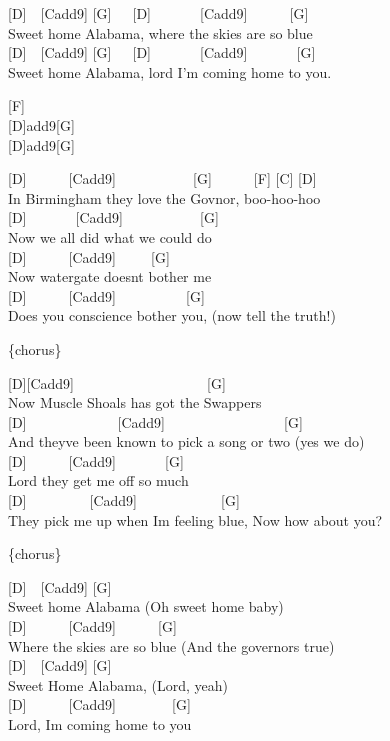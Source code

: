\documentclass[
  letterpaper,
  twoside=false]{scrbook}
\begin{document}
{[}D{]}~~{[}Cadd9{]}
{[}G{]}~~~{[}D{]}~~~~~~~{[}Cadd9{]}~~~~~~{[}G{]}~~~~~~~~\\
Sweet home Alabama, where the skies are so blue\\
{[}D{]}~~{[}Cadd9{]}
{[}G{]}~~~{[}D{]}~~~~~~~{[}Cadd9{]}~~~~~~~{[}G{]}~~~~~\\
Sweet home Alabama, lord I'm coming home to you.

{[}F{]}\\
{[}D{]}add9{[}G{]}\\
{[}D{]}add9{[}G{]}

{[}D{]}~~~~~~{[}Cadd9{]}~~~~~~~~~~~{[}G{]}~~~~~~{[}F{]} {[}C{]}
{[}D{]}\\
In Birmingham they love the Gov\textquotesingle nor, boo-hoo-hoo\\
{[}D{]}~~~~~~~{[}Cadd9{]}~~~~~~~~~~~{[}G{]}\\
Now we all did what we could do\\
{[}D{]}~~~~~~{[}Cadd9{]}~~~~~{[}G{]}\\
Now watergate doesn\textquotesingle t bother me\\
{[}D{]}~~~~~~{[}Cadd9{]}~~~~~~~~~~{[}G{]}\\
Does you conscience bother you, (now tell the truth!)

\{chorus\}

{[}D{]}{[}Cadd9{]}~~~~~~~~~~~~~~~~~~~{[}G{]}\\
Now Muscle Shoals has got the Swappers\\
{[}D{]}~~~~~~~~~~~~~{[}Cadd9{]}~~~~~~~~~~~~~~~~~{[}G{]}\\
And they\textquotesingle ve been known to pick a song or two (yes we
do)\\
{[}D{]}~~~~~~{[}Cadd9{]}~~~~~~~{[}G{]}\\
Lord they get me off so much\\
{[}D{]}~~~~~~~~~{[}Cadd9{]}~~~~~~~~~~~~{[}G{]}~~~\\
They pick me up when I\textquotesingle m feeling blue, Now how about
you?

\{chorus\}

{[}D{]}~~{[}Cadd9{]} {[}G{]}~~~~~\\
Sweet home Alabama (Oh sweet home baby)\\
{[}D{]}~~~~~~{[}Cadd9{]}~~~~~~{[}G{]}~~~\\
Where the skies are so blue (And the governor\textquotesingle s true)\\
{[}D{]}~~{[}Cadd9{]} {[}G{]}\\
Sweet Home Alabama, (Lord, yeah)\\
{[}D{]}~~~~~~{[}Cadd9{]}~~~~~~~~{[}G{]}\\
Lord, I\textquotesingle m coming home to you
\end{document}
